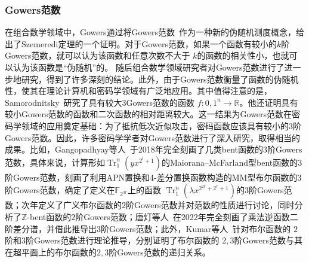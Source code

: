 \documentclass[a4paper,zihao=-4,AutoFakeBold]{ctexart}
\newcommand{\Tr}{\operatorname{Tr}_1^n}
\newcommand{\F}{\mathbb{F}}
\newcommand{\Z}{\mathbb{Z}}
\begin{document}
\subsubsection{Gowers范数}
在组合数学领域中，Gowers通过将Gowers范数~\cite{Gowers1998A}作为一种新的伪随机测度概念，给出了Szemeredi定理的一个证明。对于Gowers范数，如果一个函数有较小的$k$阶Gowers范数，就可以认为该函数和任意次数不大于 $k$的函数的相关性小，也就可以认为该函数是``伪随机''的。 
随后组合数学领域研究者对Gowers范数进行了进一步地研究，得到了许多深刻的结论。此外，由于Gowers范数衡量了函数的伪随机性，使其在理论计算机和密码学领域有广泛地应用。其中值得注意的是，Samorodnitsky~\cite{SamSTOCy07}研究了具有较大$3$Gowers范数的函数 $f:{0,1}^n\to\mathbb{R}$。他还证明具有较小Gowers范数的函数和二次函数的相对距离较大。这一结果为Gowers范数在密码学领域的应用奠定基础：为了抵抗低次近似攻击，密码函数应该具有较小的$3$阶Gowers范数。因此，许多密码学学者对Gowers范数进行了深入研究，取得相当的成果。比如，Gangopadhyay等人~\cite{GMS18}于2018年完全刻画了几类bent函数的$3$阶Gowers范数，具体来说，计算形如$\Tr(yx^{2^i+1})$的Maiorana–McFarland型bent函数的$3$阶Gowers范数，刻画了利用APN置换和4-差分置换函数构造的MM型布尔函数的$3$阶Gowers范数，确定了定义在$\F_{2^{3r}}$上的函数 $\Tr(\lambda x^{2^{2r}+2^r+1})$的$3$阶Gowers范数；次年定义了广义布尔函数的$2$阶Gowers范数并对范数的性质进行讨论，同时分析了$\Z$-bent函数的$2$阶Gowers范数；唐灯等人~\cite{InverseFuncDAM2021}在2022年完全刻画了乘法逆函数二阶差分谱，并借此推导出$3$阶Gowers范数；此外，Kumar等人~\cite{KumarMG23u2u3}针对布尔函数的 $2$阶和$3$阶Gowers范数进行理论推导，分别证明了布尔函数的 $2,3$阶Gowers范数与其在超平面上的布尔函数的$2,3$阶Gowers范数的递归关系。
\end{document}

